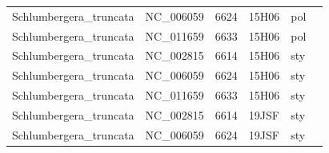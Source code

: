 \documentclass[11pt]{article}
\begin{document}
\begin{supptable}[ht]
{\begin{tabular}{@{}llllll@{}}
Schlumbergera\_truncata    & NC\_006059  & 6624            & 15H06        & pol          \\
Schlumbergera\_truncata    & NC\_011659  & 6633            & 15H06        & pol          \\
Schlumbergera\_truncata    & NC\_002815  & 6614            & 15H06        & sty          \\
Schlumbergera\_truncata    & NC\_006059  & 6624            & 15H06        & sty          \\
Schlumbergera\_truncata    & NC\_011659  & 6633            & 15H06        & sty          \\
Schlumbergera\_truncata    & NC\_002815  & 6614            & 19JSF        & sty          \\
Schlumbergera\_truncata    & NC\_006059  & 6624            & 19JSF        & sty  
\end{tabular}}
\end{supptable}
\end{document}
